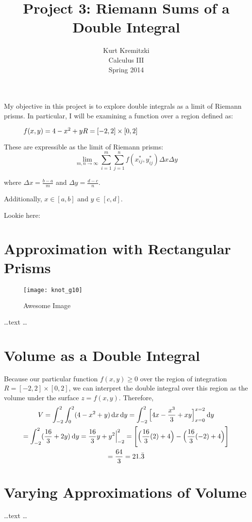 \documentclass{article}
\begin{document}
\title{Project 3: Riemann Sums of a Double Integral}
\author{Kurt Kremitzki\\
        Calculus III\\
        Spring 2014}
\maketitle

My objective in this project is to explore double integrals as a limit of Riemann prisms. In particular, I will be examining a function
over a region defined as:

\begin{figure}[h]
$f(x,y) = 4 - x^2 + y
\hfill R = [-2,2] \times [0,2]$
\end{figure}

These are expressible as the limit of Riemann prisms:
\begin{equation}
    \lim_{m,n \to \infty} \sum_{i=1}^{m} \sum_{j=1}^{n} f(x_{ij}^{ *}, y_{ij}^{ *}) \Delta x \Delta y
\end{equation}

where $\Delta x = \frac{b-a}{m}$ and $\Delta y = \frac{d - c}{n}$.

Additionally, $x \in [a, b]$ and $y \in [c, d]$.

Lookie here:

\section{Approximation with Rectangular Prisms}
\begin{SCfigure}
    \centering
    \texttt{[image: knot\_g10]}
    \caption{Awesome Image}
\end{SCfigure}

    \ldots text \ldots

\section{Volume as a Double Integral}
    Because our particular function $f(x,y) \geq 0$ over the region of integration \\
    $R = [-2, 2] \times [0, 2]$, we can
    interpret the double integral over this region as the volume under the surface $z = f(x, y)$. Therefore, 
\begin{gather}
    \notag{V = \int_{-2}^2 \int_0^2 (4 - x^2 + y) \, \mathrm{d}x \, \mathrm{d}y = \int_{-2}^2 \Big[ 4x - \frac{x^3}{3} + xy \Big]_{x = 0}^{x = 2} \: \mathrm{d}y} \\
    \notag{= \int_{-2}^2 (\frac{16}{3} + 2y) \: \mathrm{d}y = \frac{16}{3}y + y^2 \Big|_{-2}^{2} = \Bigg[\Big(\frac{16}{3}(2) + 4\Big) - \Big(\frac{16}{3}(-2) + 4\Big)\Bigg]} \\
    \notag{= \frac{64}{3} = 21.\bar{3}}
\end{gather}

\section{Varying Approximations of Volume}
    \ldots text \ldots
\end{document}
